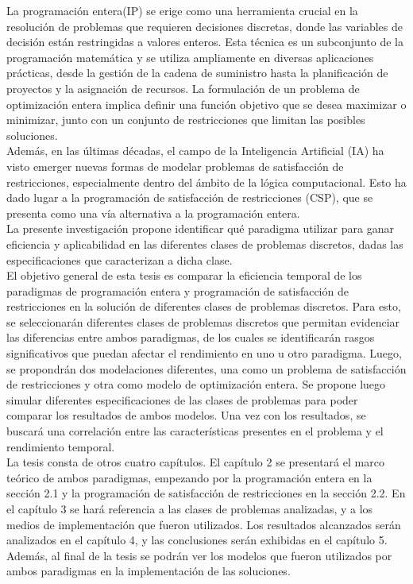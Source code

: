 \documentclass[12pt]{report}
\begin{document}
La programación entera(IP) se erige como una herramienta crucial en la resolución de problemas que requieren decisiones discretas, donde las variables de decisión están restringidas a valores enteros. Esta técnica es un subconjunto de la programación matemática y se utiliza ampliamente en diversas aplicaciones prácticas, desde la gestión de la cadena de suministro hasta la planificación de proyectos y la asignación de recursos. La formulación de un problema de optimización entera implica definir una función objetivo que se desea maximizar o minimizar, junto con un conjunto de restricciones que limitan las posibles soluciones.  \\

Además, en las últimas décadas, el campo de la Inteligencia Artificial (IA) ha visto emerger nuevas formas de modelar problemas de satisfacción de restricciones, especialmente dentro del ámbito de la lógica computacional. Esto ha dado lugar a la programación de satisfacción de restricciones (CSP), que se presenta como una vía alternativa a la programación entera.  \\

La presente investigación propone identificar qué paradigma utilizar para ganar eficiencia y aplicabilidad en las diferentes clases de problemas discretos, dadas las especificaciones que caracterizan a dicha clase.  \\

El objetivo general de esta tesis es comparar la eficiencia temporal de los paradigmas de programación entera y programación de satisfacción de restricciones en la solución de diferentes clases de problemas discretos. Para esto, se seleccionarán diferentes clases de problemas discretos que permitan evidenciar las diferencias entre ambos paradigmas, de los cuales se identificarán rasgos significativos que puedan afectar el rendimiento en uno u otro paradigma. Luego, se propondrán dos modelaciones diferentes, una como un problema de satisfacción de restricciones y otra como modelo de optimización entera. Se propone luego simular diferentes especificaciones de las clases de problemas para poder comparar los resultados de ambos modelos. Una vez con los resultados, se buscará una correlación entre las características presentes en el problema y el rendimiento temporal.\\

La tesis consta de otros cuatro capítulos. El capítulo 2 se presentará el marco teórico de ambos paradigmas, empezando por la programación entera en la sección 2.1 y la programación de satisfacción de restricciones en la sección 2.2. En el capítulo 3 se hará referencia a las clases de problemas analizadas, y a los medios de implementación que fueron utilizados. Los resultados alcanzados serán analizados en el capítulo 4, y las conclusiones serán exhibidas en el capítulo 5. Además, al final de la tesis se podrán ver los modelos que fueron utilizados por ambos paradigmas en la implementación de las soluciones.\\
\end{document}
